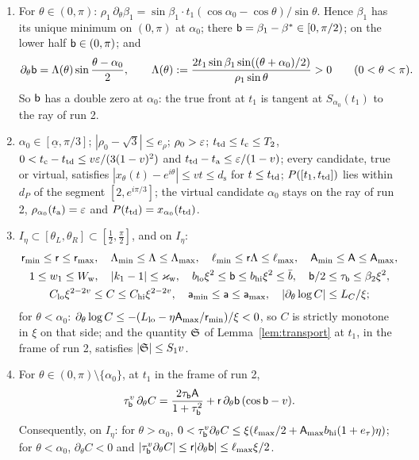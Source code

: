 \begin{lemma}\label{lem:tang}
\begin{enumerate}
\item[(a)] For $\theta\in(0,\pi)$: $\rho_1\,\partial_\theta\beta_1=\sin\beta_1\cdot t_1(\cos\alpha_0-\cos\theta)/\sin\theta$. Hence $\beta_1$ has its
unique minimum on $(0,\pi)$ at $\alpha_0$; there $\mathsf b=\beta_1-\beta^*\in[0,\pi/2)$; on the lower half $\mathsf b\in(0,\pi)$; and
\[
\partial_\theta\mathsf b=\Lambda(\theta)\sin\frac{\theta-\alpha_0}2,\qquad
\Lambda(\theta):=\frac{2t_1\sin\beta_1\sin((\theta+\alpha_0)/2)}{\rho_1\sin\theta}>0\qquad(0<\theta<\pi).
\]
So $\mathsf b$ has a double zero at $\alpha_0$: the true front at $t_1$ is tangent at $S_{\alpha_0}(t_1)$ to the ray of run 2.
\item[(b)] $\alpha_0\in[\underline\alpha,\pi/3]$; $|\rho_0-\sqrt3|\le e_\rho$; $\rho_0>\varepsilon$; $t_{\mathrm{td}}\le t_{\mathrm c}\le T_2$,
$0<t_{\mathrm c}-t_{\mathrm{td}}\le v\varepsilon/(3(1-v)^2)$ and $t_{\mathrm{td}}-t_{\mathrm a}\le\varepsilon/(1-v)$; every candidate, true or virtual, satisfies
$|x_\theta(t)-e^{i\theta}|\le vt\le d_{\mathrm s}$ for $t\le t_{\mathrm{td}}$; $P([t_1,t_{\mathrm{td}}])$ lies within $d_P$ of the segment $[2,e^{i\pi/3}]$; the
virtual candidate $\alpha_0$ stays on the ray of run 2, $\rho_{\alpha_0}(t_{\mathrm a})=\varepsilon$ and $P(t_{\mathrm{td}})=x_{\alpha_0}(t_{\mathrm{td}})$.
\item[(c)] $I_\eta\subset[\theta_L,\theta_R]\subset[\frac12,\frac\pi2]$, and on $I_\eta$:
\begin{gather*}
\mathsf r_{\min}\le\mathsf r\le\mathsf r_{\max},\quad\Lambda_{\min}\le\Lambda\le\Lambda_{\max},\quad\ell_{\min}\le\mathsf r\Lambda\le\ell_{\max},\quad
\mathsf A_{\min}\le\mathsf A\le\mathsf A_{\max},\\
1\le w_1\le W_{\mathrm w},\quad|k_1-1|\le\varkappa_{\mathrm w},\quad b_{\mathrm{lo}}\xi^2\le\mathsf b\le b_{\mathrm{hi}}\xi^2\le\bar b,\quad
\mathsf b/2\le\tau_{\mathsf b}\le\beta_2\xi^2,\\
C_{\mathrm{lo}}\xi^{2-2v}\le C\le C_{\mathrm{hi}}\xi^{2-2v},\quad\mathsf a_{\min}\le\mathsf a\le\mathsf a_{\max},\quad|\partial_\theta\log C|\le L_C/\xi;
\end{gather*}
for $\theta<\alpha_0$: $\partial_\theta\log C\le-(L_{\mathrm{lo}}-\eta\mathsf A_{\max}/\mathsf r_{\min})/\xi<0$, so $C$ is strictly monotone in $\xi$ on
that side; and the quantity $\mathfrak S$ of Lemma~\ref{lem:transport} at $t_1$, in the frame of run 2, satisfies $|\mathfrak S|\le S_1v$.
\item[(d)] For $\theta\in(0,\pi)\setminus\{\alpha_0\}$, at $t_1$ in the frame of run 2,
\[
\tau_{\mathsf b}^v\,\partial_\theta C=\frac{2\tau_{\mathsf b}\mathsf A}{1+\tau_{\mathsf b}^2}+\mathsf r\,\partial_\theta\mathsf b\,(\cos\mathsf b-v).
\]
Consequently, on $I_\eta$: for $\theta>\alpha_0$, $0<\tau_{\mathsf b}^v\partial_\theta C\le\xi(\ell_{\max}/2+\mathsf A_{\max}b_{\mathrm{hi}}(1+e_\tau)\eta)$;
for $\theta<\alpha_0$, $\partial_\theta C<0$ and $|\tau_{\mathsf b}^v\partial_\theta C|\le\mathsf r|\partial_\theta\mathsf b|\le\ell_{\max}\xi/2$.
\end{enumerate}
\end{lemma}
